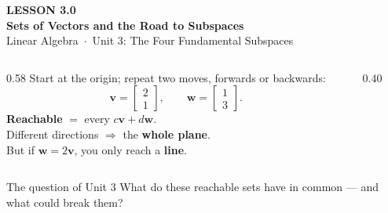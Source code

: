 \documentclass[aspectratio=169, 11pt]{beamer}
\newcommand{\vv}{\mathbf{v}}
\newcommand{\ww}{\mathbf{w}}
\begin{document}
{
\begin{frame}[plain]
  \vspace{2.8cm}\hspace{0.55cm}%
  \begin{minipage}{0.9\textwidth}
    {\color{goldacc}\bfseries\small LESSON 3.0}\\[0.5cm]
    {\color{white}\bfseries\LARGE Sets of Vectors and the Road to Subspaces}\\[1.0cm]
    {\color{blushmid}\small Linear Algebra~$\cdot$~Unit 3: The Four Fundamental Subspaces}
  \end{minipage}
\end{frame}
}

\begin{frame}[t, plain]
  \begin{columns}[T]
    \begin{column}{0.58\textwidth}
      Start at the origin; repeat two moves, forwards or backwards:
      \[ \vv=\begin{bmatrix} 2\\1 \end{bmatrix}, \qquad \ww=\begin{bmatrix} 1\\3 \end{bmatrix}. \]
      \textbf{Reachable} $= $ every $c\vv+d\ww$.\\[8pt]
      Different directions $\Rightarrow$ the \textbf{whole plane}.\\[4pt]
      But if $\ww=2\vv$, you only reach a \textbf{line}.
    \end{column}
    \begin{column}{0.40\textwidth}
      \centering
    \end{column}
  \end{columns}
  \vspace{4pt}
  \begin{block}{The question of Unit 3}
    What do these reachable sets have in common --- and what could break them?
  \end{block}
\end{frame}
\end{document}
